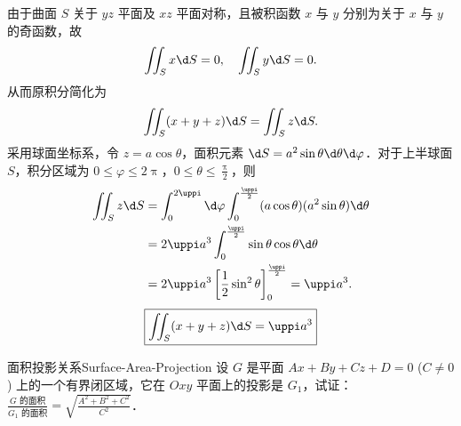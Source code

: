 \begin{solution}
    由于曲面 $S$ 关于 $yz$ 平面及 $xz$ 平面对称，且被积函数 $x$ 与 $y$ 分别为关于 $x$ 与 $y$ 的奇函数，故
    \begin{equation}
        \iint_{S} x \d S = 0, \quad \iint_{S} y \d S = 0.
    \end{equation}
    从而原积分简化为
    \begin{equation}
        \iint_{S} (x + y + z) \d S = \iint_{S} z \d S.
    \end{equation}
    采用球面坐标系，令 $z = a \cos \theta$，面积元素 $\d S = a^2 \sin \theta \d \theta \d \varphi$．对于上半球面 $S$，积分区域为 $0 \leqslant \varphi \leqslant 2\uppi$，$0 \leqslant \theta \leqslant \frac{\uppi}{2}$，则
    \begin{equation}
        \begin{aligned}
            \iint_{S} z \d S & = \int_{0}^{2\uppi} \d \varphi \int_{0}^{\frac{\uppi}{2}} (a \cos \theta) (a^2 \sin \theta) \d \theta \\
                             & = 2\uppi a^3 \int_{0}^{\frac{\uppi}{2}} \sin \theta \cos \theta \d \theta                             \\
                             & = 2\uppi a^3 \left[ \frac{1}{2} \sin^2 \theta \right]_{0}^{\frac{\uppi}{2}} = \uppi a^3.
        \end{aligned}
    \end{equation}
    \begin{equation}
        \boxed{\iint_{S} (x + y + z) \d S = \uppi a^3}
    \end{equation}
\end{solution}

\begin{problem}{面积投影关系}{Surface-Area-Projection}
    设 $G$ 是平面 $Ax + By + Cz + D = 0$ ($C \neq 0$) 上的一个有界闭区域，它在 $Oxy$ 平面上的投影是 $G_1$，试证：$\frac{G \text{ 的面积}}{G_1 \text{ 的面积}} = \sqrt{\frac{A^2 + B^2 + C^2}{C^2}}$．
\end{problem}

